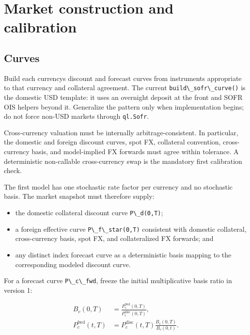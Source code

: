 \documentclass[conference]{IEEEtran}
\newcommand{\passthrough}[1]{#1}
\providecommand{\tightlist}{}
\begin{document}
\section{Market construction and
calibration}\label{5-market-construction-and-calibration}

\subsection{Curves}\label{51-curves}

Build each currency\textquotesingle s discount and forecast curves from
instruments appropriate to that currency and collateral agreement. The
current \passthrough{\lstinline!build\_sofr\_curve()!} is the domestic
USD template: it uses an overnight deposit at the front and SOFR OIS
helpers beyond it. Generalize the pattern only when implementation
begins; do not force non-USD markets through
\passthrough{\lstinline!ql.Sofr!}.

Cross-currency valuation must be internally arbitrage-consistent. In
particular, the domestic and foreign discount curves, spot FX,
collateral convention, cross-currency basis, and model-implied FX
forwards must agree within tolerance. A deterministic non-callable
cross-currency swap is the mandatory first calibration check.

The first model has one stochastic rate factor per currency and no
stochastic basis. The market snapshot must therefore supply:

\begin{itemize}
\tightlist
\item
  the domestic collateral discount curve
  \passthrough{\lstinline!P\_d(0,T)!};
\item
  a foreign effective curve \passthrough{\lstinline!P\_f\_star(0,T)!}
  consistent with domestic collateral, cross-currency basis, spot FX,
  and collateralized FX forwards; and
\item
  any distinct index forecast curve as a deterministic basis mapping to
  the corresponding modeled discount curve.
\end{itemize}

For a forecast curve \passthrough{\lstinline!P\_c\_fwd!}, freeze the
initial multiplicative basis ratio in version 1:

\begin{align*}
  B_c(0,T) &= \frac{P_c^{\mathrm{fwd}}(0,T)}{P_c^{\mathrm{disc}}(0,T)}, \\
  P_c^{\mathrm{fwd}}(t,T)
    &= P_c^{\mathrm{disc}}(t,T)\frac{B_c(0,T)}{B_c(0,t)}.
\end{align*}
\end{document}
